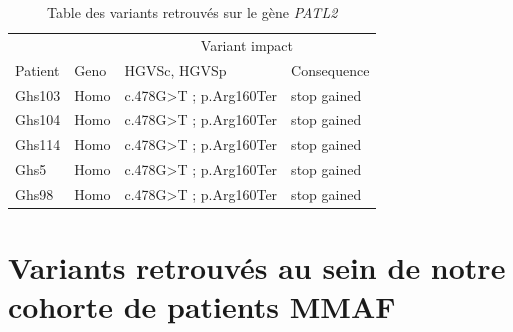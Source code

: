 \documentclass[12pt,a4paper,twoside]{ugathesis}
\theoremstyle{definition}
\theoremstyle{definition}
\theoremstyle{definition}
\theoremstyle{remark}
\begin{document}
\begin{longtable}[t]{llll}
\caption{\label{tab:tabpatl2}Table des variants retrouvés sur le gène \textit{PATL2}}\\
\toprule
\multicolumn{2}{c}{ } & \multicolumn{2}{c}{Variant impact} \\
\cmidrule(l{2pt}r{2pt}){3-4}
Patient & Geno & HGVSc, HGVSp & Consequence\\
\midrule
Ghs103 & Homo & c.478G>T ; p.Arg160Ter & stop gained\\
Ghs104 & Homo & c.478G>T ; p.Arg160Ter & stop gained\\
Ghs114 & Homo & c.478G>T ; p.Arg160Ter & stop gained\\
Ghs5 & Homo & c.478G>T ; p.Arg160Ter & stop gained\\
Ghs98 & Homo & c.478G>T ; p.Arg160Ter & stop gained\\
\bottomrule
\end{longtable}

\newpage

\chapter{Variants retrouvés au sein de notre cohorte de patients
MMAF}\label{variants-retrouves-au-sein-de-notre-cohorte-de-patients-mmaf}

\newpage
\end{document}

